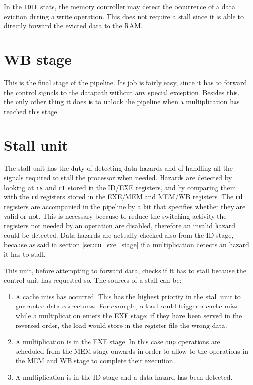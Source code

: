 In the \verb|IDLE| state, the memory controller may detect the occurrence of a data eviction during a write operation. This does not require a stall since it is able to directly forward the evicted data to the RAM.

\section{WB stage}

This is the final stage of the pipeline. Its job is fairly easy, since it has to forward the control signals to the datapath without any special exception. Besides this, the only other thing it does is to unlock
the pipeline when a multiplication has reached this stage.

\section{Stall unit}
\label{sec:stall_unit}

The stall unit has the duty of detecting data hazards and of handling all the signals required to stall the processor when needed. Hazards are detected by looking at \verb|rs| and \verb|rt| stored in the
ID/EXE registers, and by comparing them with the \verb|rd| registers stored in the EXE/MEM and MEM/WB registers. The \verb|rd| registers are accompanied in the pipeline by a bit that specifies whether
they are valid or not. This is necessary because to reduce the switching activity the registers not needed by an operation are disabled, therefore an invalid hazard could be detected.
Data hazards are actually checked also from the ID stage, because as said in section \ref{sec:cu_exe_stage} if a multiplication detects an hazard it has to stall.

This unit, before attempting to forward data, checks if it has to stall because the control unit has requested so. The sources of a stall can be:

\begin{enumerate}
    \item A cache miss has occurred. This has the highest priority in the stall unit to guarantee data correctness. For example, a load could trigger a cache miss while a multiplication enters the EXE stage:
    if they have been served in the reversed order, the load would store in the register file the wrong data.

    \item A multiplication is in the EXE stage. In this case \verb|nop| operations are scheduled from the MEM stage onwards in order to allow to the operations in the MEM and WB stage to complete their execution.
    
    \item A multiplication is in the ID stage and a data hazard has been detected. 
\end{enumerate}

